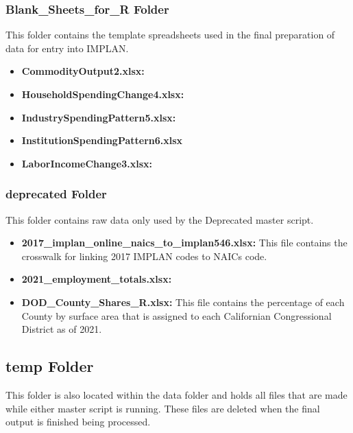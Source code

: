 \documentclass[
]{book}
\providecommand{\tightlist}{%
  \setlength{\itemsep}{0pt}\setlength{\parskip}{0pt}}
\begin{document}
\hypertarget{blank_sheets_for_r-folder}{%
\subsubsection{Blank\_Sheets\_for\_R Folder}\label{blank_sheets_for_r-folder}}

This folder contains the template spreadsheets used in the final preparation of data for entry into IMPLAN.

\begin{itemize}
\tightlist
\item
  \textbf{CommodityOutput2.xlsx:}
\item
  \textbf{HouseholdSpendingChange4.xlsx:}
\item
  \textbf{IndustrySpendingPattern5.xlsx:}
\item
  \textbf{InstitutionSpendingPattern6.xlsx}
\item
  \textbf{LaborIncomeChange3.xlsx:}
\end{itemize}

\hypertarget{deprecated-folder}{%
\subsubsection{deprecated Folder}\label{deprecated-folder}}

This folder contains raw data only used by the Deprecated master script.

\begin{itemize}
\tightlist
\item
  \textbf{2017\_implan\_online\_naics\_to\_implan546.xlsx:} This file contains the crosswalk for linking 2017 IMPLAN codes to NAICs code.
\item
  \textbf{2021\_employment\_totals.xlsx:}
\item
  \textbf{DOD\_County\_Shares\_R.xlsx:} This file contains the percentage of each County by surface area that is assigned to each Californian Congressional District as of 2021.
\end{itemize}

\hypertarget{temp-folder}{%
\subsection{temp Folder}\label{temp-folder}}

This folder is also located within the data folder and holds all files that are made while either master script is running. These files are deleted when the final output is finished being processed.
\end{document}
